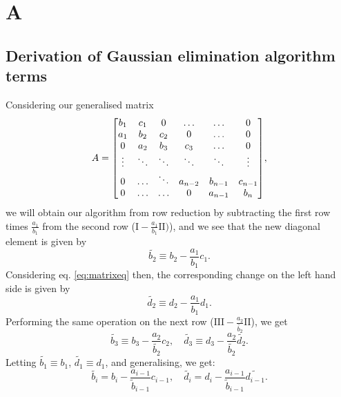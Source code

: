 \onecolumn
\section*{A}
\label{sec:appendix}
\renewcommand{\theequation}{\thesection .\arabic{equation}}

\subsection*{Derivation of Gaussian elimination algorithm terms}
\label{sec:derivgauss}
Considering our generalised matrix
  \[A =
    \mqty[b_1 & c_1 & 0 & \hdots & \hdots & 0 \\
          a_1 & b_2 & c_2 & 0 & \hdots & 0 \\
          0 & a_2 & b_3 & c_3 & \hdots & 0 \\
          \vdots & \ddots & \ddots & \ddots & \ddots & \vdots \\
          0 & \hdots & \ddots & a_{n-2} & b_{n-1} & c_{n-1} \\
          0 & \hdots & \hdots & 0 & a_{n-1} & b_n],
  \]
we will obtain our algorithm from row reduction by subtracting the first row
times $\frac{a_1}{b_1}$ from the second row ($\text{I} - \frac{a_1}{b_1}\text{II}
)$), and we see that the new diagonal element is given by
  \[\widetilde{b_2} \equiv b_2 - \frac{a_1}{b_1}c_1.\]
Considering eq. \ref{eq:matrixeq} then, the corresponding change on the left
hand side is given by
  \[\widetilde{d_2} \equiv d_2 - \frac{a_1}{b_1}d_1.\]
Performing the same operation on the next row
($\text{III} - \frac{a_2}{\widetilde{b_2}}\text{II}$), we get
  \[\widetilde{b_3} \equiv b_3 - \frac{a_2}{\widetilde{b_2}}c_2, \quad
  \widetilde{d_3} \equiv d_3 - \frac{a_2}{\widetilde{b_2}}\widetilde{d_2}.
  \]
Letting $\widetilde{b_1} \equiv b_1$, $\widetilde{d_1} \equiv d_1$, and
generalising, we get:
  \begin{equation}
    \widetilde{b_i} = b_i - \frac{a_{i-1}}{\widetilde{b}_{i-1}}c_{i-1}, \quad
    \widetilde{d_i} = d_i - \frac{a_{i-1}}{\widetilde{b}_{i-1}}\widetilde{d_{i-1}}.
  \end{equation}
